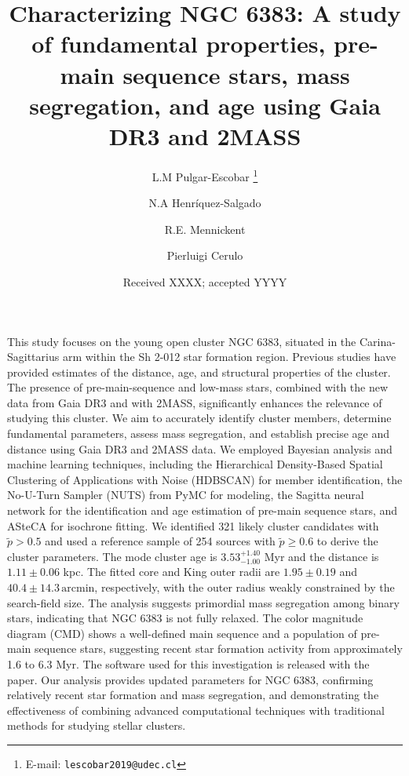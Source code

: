 \documentclass{aa}
\begin{document}
\raggedbottom
{}

   \title{Characterizing NGC 6383: A study of fundamental properties, pre-main sequence stars, mass segregation, and age using Gaia DR3 and 2MASS}

   \author{L.M Pulgar-Escobar
          \thanks{E-mail: \texttt{lescobar2019@udec.cl}}
          \and
        N.A Henríquez-Salgado
        \and 
        R.E. Mennickent
        \and
        Pierluigi Cerulo
          }


   \date{Received XXXX; accepted YYYY}

  \abstract
   {This study focuses on the young open cluster NGC 6383, situated in the Carina-Sagittarius arm within the Sh 2-012 star formation region. Previous studies have provided estimates of the distance, age, and structural properties of the cluster. The presence of pre-main-sequence and low-mass stars, combined with the new data from Gaia DR3 and with 2MASS, significantly enhances the relevance of studying this cluster.}
   {We aim to accurately identify cluster members, determine fundamental parameters, assess mass segregation, and establish precise age and distance using Gaia DR3 and 2MASS data.}
   {We employed Bayesian analysis and machine learning techniques, including the Hierarchical Density-Based Spatial Clustering of Applications with Noise (HDBSCAN) for member identification, the No-U-Turn Sampler (NUTS) from PyMC for modeling, the Sagitta neural network for the identification and age estimation of pre-main sequence stars, and ASteCA for isochrone fitting.}   
   {We identified 321 likely cluster candidates with $\tilde{p}>0.5$ and used a reference sample of 254 sources with $\tilde{p}\geq0.6$ to derive the cluster parameters. The mode cluster age is $3.53^{+1.40}_{-1.00}$ Myr and the distance is $1.11\pm 0.06$ kpc. The fitted core and King outer radii are $1.95 \pm 0.19$ and $40.4 \pm 14.3\,\mathrm{arcmin}$, respectively, with the outer radius weakly constrained by the search-field size. The analysis suggests primordial mass segregation among binary stars, indicating that NGC 6383 is not fully relaxed. The color magnitude diagram (CMD) shows a well-defined main sequence and a population of pre-main sequence stars, suggesting recent star formation activity from approximately 1.6 to 6.3 Myr. The software used for this investigation is released with the paper.}
   {Our analysis provides updated parameters for NGC 6383, confirming relatively recent star formation and mass segregation, and demonstrating the effectiveness of combining advanced computational techniques with traditional methods for studying stellar clusters.}
\end{document}
